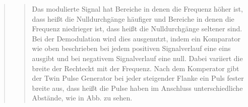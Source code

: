 \begin{quote}
\begin{quote}
        Das modulierte Signal hat Bereiche in denen die Frequenz höher ist, dass
        heißt die Nulldurchgänge häufiger und Bereiche in denen die Frequenz
        niedrieger ist, dass heißt die Nulldurchgänge seltener sind. Bei der
        Demodulation wird dies ausgenutzt, indem ein Komparator wie oben
        beschrieben bei jedem positiven Signalverlauf eine  eins ausgibt und bei
        negativem Signalverlauf eine null. Dabei variiert die breite der
        Rechteckt mit der Frequenz. Nach dem Komperator gibt der Twin Pulse
        Generator bei jeder steigender Flanke ein Puls fester breite aus, dass
        heißt die Pulse haben im Anschluss unterschiedliche Abstände, wie in
        Abb. zu sehen.\\
       
        
    \end{quote}
    
\end{quote}



%     
%         

% 
% 
% 



